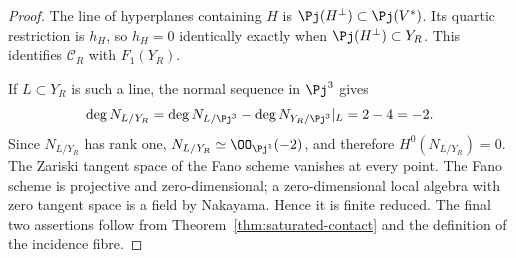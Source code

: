 \begin{proof}
The line of hyperplanes containing \(H\) is
\(\Pj(H^\perp)\subset\Pj(V^*)\).  Its quartic restriction is
\(h_H\), so \(h_H=0\) identically exactly when
\(\Pj(H^\perp)\subset Y_R\).  This identifies \(\mathcal C_R\) with
\(F_1(Y_R)\).

If \(L\subset Y_R\) is such a line, the normal sequence in
\(\Pj^3\) gives
\[
 \deg N_{L/Y_R}
 =
 \deg N_{L/\Pj^3}-\deg N_{Y_R/\Pj^3}|_L
 =2-4=-2.
\]
Since \(N_{L/Y_R}\) has rank one,
\(N_{L/Y_R}\simeq\OO_{\Pj^1}(-2)\), and therefore
\(H^0(N_{L/Y_R})=0\).  The Zariski tangent space of the Fano scheme
vanishes at every point.  The Fano scheme is projective and
zero-dimensional; a zero-dimensional local algebra with zero tangent
space is a field by Nakayama.  Hence it is finite reduced.  The final
two assertions follow from Theorem~\ref{thm:saturated-contact} and
the definition of the incidence fibre.
\end{proof}

